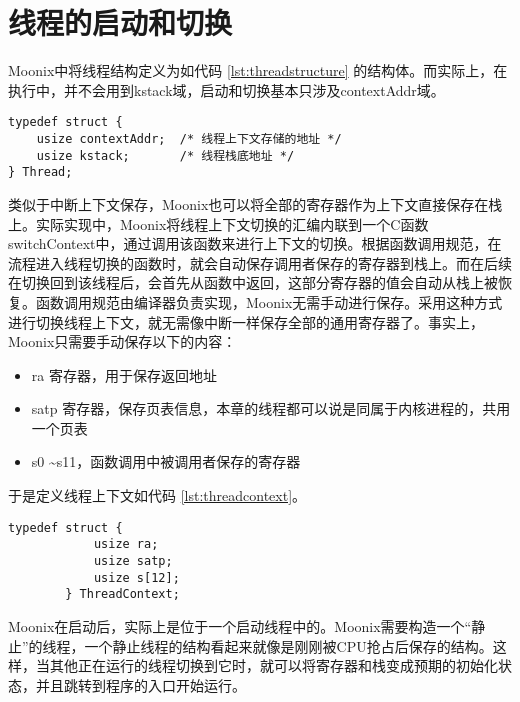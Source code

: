 \section{线程的启动和切换}

Moonix中将线程结构定义为如代码 \ref{lst:threadstructure} 的结构体。而实际上，在执行中，并不会用到kstack域，启动和切换基本只涉及contextAddr域。

\begin{minipage}[c]{0.95\textwidth}
\begin{lstlisting}[language={moonix}, caption={线程结构定义}, label={lst:threadstructure}]
typedef struct {
	usize contextAddr;  /* 线程上下文存储的地址 */
	usize kstack;       /* 线程栈底地址 */
} Thread;
\end{lstlisting}
\end{minipage}

类似于中断上下文保存，Moonix也可以将全部的寄存器作为上下文直接保存在栈上。实际实现中，Moonix将线程上下文切换的汇编内联到一个C函数switchContext中，通过调用该函数来进行上下文的切换。根据函数调用规范，在流程进入线程切换的函数时，就会自动保存调用者保存的寄存器到栈上。而在后续在切换回到该线程后，会首先从函数中返回，这部分寄存器的值会自动从栈上被恢复。函数调用规范由编译器负责实现，Moonix无需手动进行保存。采用这种方式进行切换线程上下文，就无需像中断一样保存全部的通用寄存器了。事实上，Moonix只需要手动保存以下的内容：

\begin{itemize}
	\item ra 寄存器，用于保存返回地址
	\item satp 寄存器，保存页表信息，本章的线程都可以说是同属于内核进程的，共用一个页表
	\item s0 \textasciitilde s11，函数调用中被调用者保存的寄存器
\end{itemize}

于是定义线程上下文如代码 \ref{lst:threadcontext}。

\begin{minipage}[c]{0.95\textwidth}
	\begin{lstlisting}[language={moonix}, caption={线程上下文定义}, label={lst:threadcontext}]
		typedef struct {
			usize ra;
			usize satp;
			usize s[12];
		} ThreadContext;
	\end{lstlisting}
\end{minipage}

Moonix在启动后，实际上是位于一个启动线程中的。Moonix需要构造一个“静止”的线程，一个静止线程的结构看起来就像是刚刚被CPU抢占后保存的结构。这样，当其他正在运行的线程切换到它时，就可以将寄存器和栈变成预期的初始化状态，并且跳转到程序的入口开始运行。


